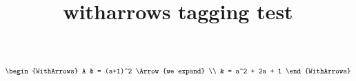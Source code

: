 \documentclass{article}
\title{witharrows tagging test}
\begin{document}
$\begin{WithArrows}
A & = (a+1)^2 \Arrow{we expand} \\
& = a^2 + 2a + 1
\end{WithArrows}$
\end{document}
